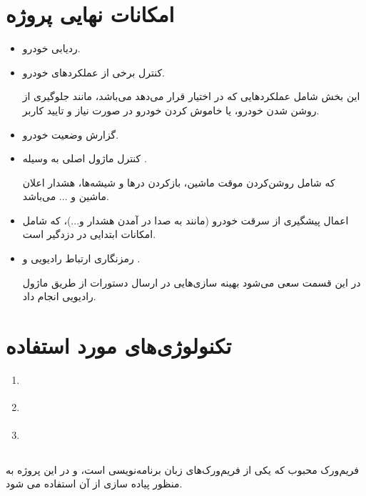 \documentclass[a4paper,12pt]{report}
\begin{document}
	\section{
	امکانات نهایی پروژه
	}\label{sec4:chap1}
	\begin{itemize}[nosep]\label{item1:sec4:chap1}
		\item
			ردیابی خودرو.
		\item
			کنترل برخی از عملکرد‌های خودرو.

			این بخش شامل عملکرد‌هایی که
			در اختیار قرار می‌دهد می‌باشد،‌ مانند جلوگیری از روشن شدن خودرو، یا خاموش کردن خودرو در صورت نیاز و تایید کاربر.
		\item
			گزارش وضعیت خودرو.
		\item
			کنترل ماژول اصلی به وسیله
			.

			که شامل روشن‌کردن موقت ماشین، بازکردن درها و شیشه‌ها، هشدار اعلان ماشین و ... می‌باشد.
		\item
			اعمال پیشگیری از سرقت خودرو (مانند به صدا در آمدن هشدار و...)، که شامل امکانات ابتدایی در دزدگیر است.
		\item
			رمزنگاری ارتباط رادیویی و
			.

			در این قسمت سعی می‌شود بهینه سازی‌هایی در ارسال دستورات
			 از طریق ماژول رادیویی انجام داد.
	\end{itemize}
	\newpage
	\section{
		تکنولوژی‌های مورد استفاده
	}\label{sec5:chap1}

	\begin{enumerate}[nosep]\label{item1:sec5:chap1}
		\item
			\hyperref[subsec1:sec5:chap1]{}
		\item
			\hyperref[subsec2:sec5:chap1]{}
		\item
			\hyperref[subsec3:sec5:chap1]{}
	\end{enumerate}

	\subsection{}\label{subsec1:sec5:chap1}
		فریم‌ورک
		محبوب
		که یکی از فریم‌ورک‌های زبان برنامه‌نویسی
		است، و در این پروژه به منظور پیاده سازی
		از آن استفاده می شود.
\end{document}

